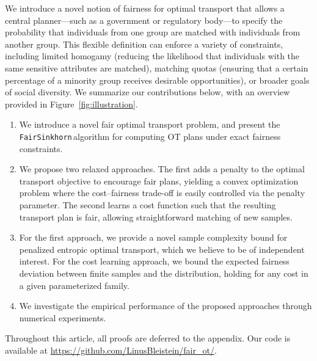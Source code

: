 \documentclass{article}
\newcommand{\fairsinkhorn}{\texttt{FairSinkhorn}\,}
\theoremstyle{definition}
\begin{document}
We introduce a novel notion of fairness for optimal transport that allows a central planner—such as a government or regulatory body—to specify the probability that individuals from one group are matched with individuals from another group. This flexible definition can enforce a variety of constraints, including limited homogamy (reducing the likelihood that individuals with the same sensitive attributes are matched), matching quotas (ensuring that a certain percentage of a minority group receives desirable opportunities), or broader goals of social diversity. We summarize our contributions below, with an overview provided in Figure~\ref{fig:illustration}.
\begin{enumerate}[itemsep=1pt, parsep=2pt, topsep=1pt]
    \item We introduce a novel fair optimal transport problem, and present the \fairsinkhorn algorithm for computing OT plans under exact fairness constraints.
    \item We propose two relaxed approaches. The first adds a penalty to the optimal transport objective to encourage fair plans, yielding a convex optimization problem where the cost–fairness trade-off is easily controlled via the penalty parameter. The second learns a cost function such that the resulting transport plan is fair, allowing straightforward matching of new samples.
    \item For the first approach, we provide a novel sample complexity bound for penalized entropic optimal transport, which we believe to be of independent interest. For the cost learning approach, we bound the expected fairness deviation between finite samples and the distribution, holding for any cost in a given parameterized family.
    \item We investigate the empirical performance of the proposed approaches through numerical experiments.
\end{enumerate}

Throughout this article, all proofs are deferred to the appendix. Our code is available at {\small \url{https://github.com/LinusBleistein/fair_ot/}}.
\end{document}
